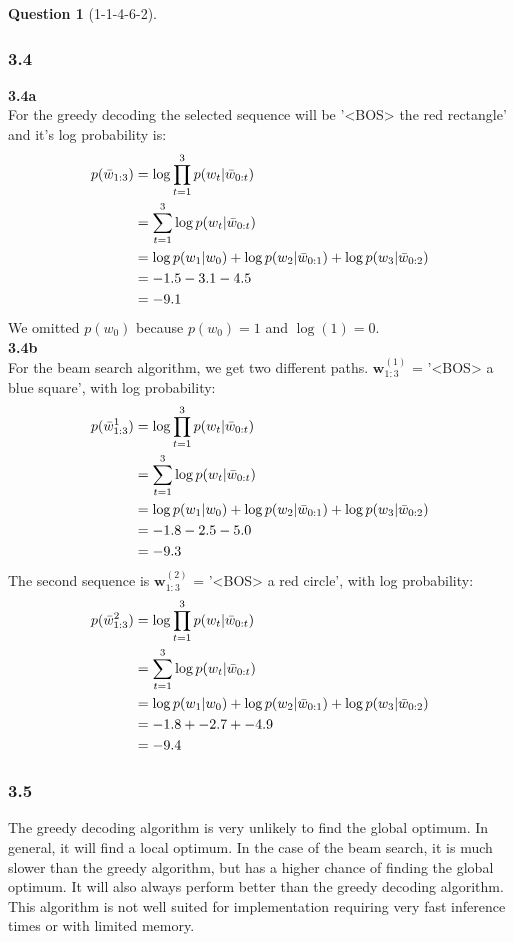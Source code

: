 \documentclass[12pt]{article}
\theoremstyle{definition}
\newtheorem{exercise}{Question}%
\begin{document}
\begin{exercise}[1-1-4-6-2]
{    \subsubsection*{3.4}
    \textbf{3.4a}
    \\
    For the greedy decoding the selected sequence will be '<BOS> the red rectangle' and it's
    log probability is:
    \begin{align*}
      p(\bar{w}_{1:3}) &= \log \prod_{t=1}^{3} p(w_{t}| \boldmath{\bar{w}}_{0:t}) \\
      &=\sum_{t=1}^{3} \log p(w_{t}| \boldmath{\bar{w}}_{0:t}) \\
      &= \log p(w_{1}| w_{0})+\log p(w_{2}| \bar{w}_{0:1})+\log p(w_{3}| \bar{ w }_{0:2})\\
      &= -1.5 -3.1 -4.5 \\
      &= -9.1
    \end{align*}We omitted $p(w_{0})$ because $p(w_{0})=1$ and $\log (1)=0$.
    \\
    \textbf{3.4b}
    \\
    For the beam search algorithm, we get two different paths.
    $\mathbf{w}_{1:3}^{(1)}$ = '<BOS> a blue square', with log probability:
    \begin{align*}
      p(\bar{w}_{1:3}^{1}) &= \log \prod_{t=1}^{3} p(w_{t}| \boldmath{\bar{w}}_{0:t}) \\
      &=\sum_{t=1}^{3} \log p(w_{t}| \boldmath{\bar{w}}_{0:t}) \\
      &= \log p(w_{1}| w_{0})+\log p(w_{2}| \bar{w}_{0:1})+\log p(w_{3}| \bar{ w }_{0:2})\\
      &= -1.8 -2.5 -5.0 \\
      &= -9.3
    \end{align*}
    The second sequence is $\mathbf{w}_{1:3}^{(2)}$ = '<BOS> a red circle', with log probability:
    \begin{align*}
      p(\bar{w}_{1:3}^{2}) &= \log \prod_{t=1}^{3} p(w_{t}| \boldmath{\bar{w}}_{0:t}) \\
      &=\sum_{t=1}^{3} \log p(w_{t}| \boldmath{\bar{w}}_{0:t}) \\
      &= \log p(w_{1}| w_{0})+\log p(w_{2}| \bar{w}_{0:1})+\log p(w_{3}| \bar{ w }_{0:2})\\
      &= -1.8 + -2.7 + -4.9\\
      &= -9.4
    \end{align*}
    \subsubsection*{3.5}
    The greedy decoding algorithm is very unlikely to find the global
    optimum. In general, it will find a local optimum. In the case of the beam
    search, it is much slower than the greedy algorithm, but has a higher
    chance of finding the global optimum. It will also always perform better
    than the greedy decoding algorithm. This algorithm is not well suited for
    implementation requiring very fast inference times or with limited memory.
    }
\end{exercise}
\end{document}
